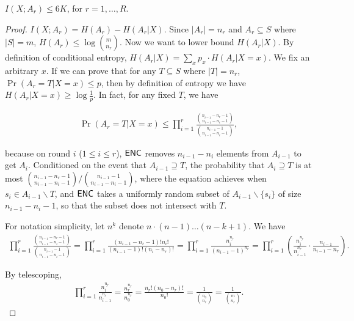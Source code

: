 \begin{lemma}\label{lemma:mutual-entropy-bound}
  $I(X;A_r)\le 6K$, for $r=1,\ldots, R$.
\end{lemma}

\begin{proof}
  $I(X;A_r)=H(A_r)-H(A_r|X)$. Since $|A_r|=n_r$ and $A_r\subseteq S$ where $|S|=m$, $H(A_r)\le \log {m \choose n_r}$. Now we want to lower bound $H(A_r|X)$. By definition of conditional entropy, $H(A_r|X)=\sum_x{p_x\cdot H(A_r|X=x)}$. We fix an arbitrary $x$. If we can prove that for any $T\subseteq S$ where $|T|=n_r$, $\Pr(A_r=T|X=x)\le p$, then by definition of entropy we have $H(A_r|X=x)\ge\log\frac{1}{p}$. In fact, for any fixed $T$, we have
  
  \begin{align}
    \Pr(A_r=T|X=x)\le \prod_{i=1}^{r}{\frac{{n_{i-1}-n_r-1 \choose n_{i-1}-n_i-1}}{{n_{i-1}-1 \choose n_{i-1}-n_i-1}}},
  \end{align}
  
  because on round $i$ ($1\le i \le r$), $\textsf{ENC}$ removes $n_{i-1}-n_i$ elements from $A_{i-1}$ to get $A_i$. Conditioned on the event that $A_{i-1}\supseteq T$, the probability that $A_i\supseteq T$ is at most ${{n_{i-1}-n_r-1 \choose n_{i-1}-n_i-1}}/{{n_{i-1}-1 \choose n_{i-1}-n_i-1}}$, where the equation achieves when $s_i\in A_{i-1}\backslash T$, and $\textsf{ENC}$ takes a uniformly random subset of $A_{i-1}\backslash \{s_i\}$ of size $n_{i-1}-n_i-1$, so that the subset does not intersect with $T$.
  
  For notation simplicity, let $n^{\underline{k}}$ denote $n\cdot (n-1)\ldots (n-k+1)$. We have 
  \begin{align}
    \prod_{i=1}^{r}{\frac{{n_{i-1}-n_r-1 \choose n_{i-1}-n_i-1}}{{n_{i-1}-1 \choose n_{i-1}-n_i-1}}}
    =\prod_{i=1}^{r}\frac{(n_{i-1}-n_r-1)!n_i!}{(n_{i-1}-1)!(n_i-n_r)!}
    =\prod_{i=1}^{r}\frac{n_i^{\underline{n_r}}}{(n_{i-1}-1)^{\underline{n_r}}}
    =\prod_{i=1}^{r} \left( \frac{n_i^{\underline{n_r}}}{n_{i-1}^{\underline{n_r}}}\cdot \frac{n_{i-1}}{n_{i-1}-n_r} \right).
  \end{align}
  
  By telescoping,
  \begin{align}
    \prod_{i=1}^{r} \frac{n_i^{\underline{n_r}}}{n_{i-1}^{\underline{n_r}}}
    =\frac{n_r^{\underline{n_r}}}{n_0^{\underline{n_r}}}
    =\frac{n_r!(n_0-n_r)!}{n_0!}=\frac{1}{{n_0 \choose n_r}}
    =\frac{1}{{m \choose n_r}}.
  \end{align}
  

\end{proof}
